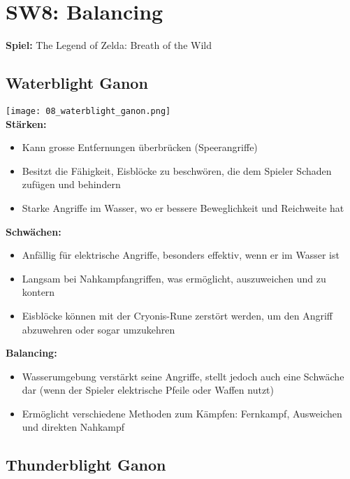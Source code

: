 \documentclass{article}
\begin{document}
\section{SW8: Balancing}

\textbf{Spiel:} The Legend of Zelda: Breath of the Wild

\subsection{Waterblight Ganon}

\texttt{[image: 08\_waterblight\_ganon.png]}
\\
\textbf{Stärken:}
\begin{itemize}
    \item Kann grosse Entfernungen überbrücken (Speerangriffe)
    \item Besitzt die Fähigkeit, Eisblöcke zu beschwören, die dem Spieler Schaden zufügen und behindern
    \item Starke Angriffe im Wasser, wo er bessere Beweglichkeit und Reichweite hat
\end{itemize}
\bigskip
\textbf{Schwächen:}
\begin{itemize}
    \item Anfällig für elektrische Angriffe, besonders effektiv, wenn er im Wasser ist
    \item Langsam bei Nahkampfangriffen, was ermöglicht, auszuweichen und zu kontern
    \item Eisblöcke können mit der Cryonis-Rune zerstört werden, um den Angriff abzuwehren oder sogar umzukehren
\end{itemize}
\bigskip
\textbf{Balancing:}
\begin{itemize}
    \item Wasserumgebung verstärkt seine Angriffe, stellt jedoch auch eine Schwäche dar (wenn der Spieler elektrische Pfeile oder Waffen nutzt)
    \item Ermöglicht verschiedene Methoden zum Kämpfen: Fernkampf, Ausweichen und direkten Nahkampf
\end{itemize}

\subsection{Thunderblight  Ganon}
\end{document}
